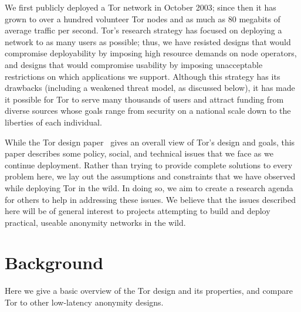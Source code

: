 \documentclass{llncs}
\begin{document}
We first publicly deployed a Tor network in October 2003; since then it has
grown to over a hundred volunteer Tor nodes
and as much as 80 megabits of
average traffic per second.  Tor's research strategy has focused on deploying
a network to as many users as possible; thus, we have resisted designs that
would compromise deployability by imposing high resource demands on node
operators, and designs that would compromise usability by imposing
unacceptable restrictions on which applications we support.  Although this
strategy has
its drawbacks (including a weakened threat model, as discussed below), it has
made it possible for Tor to serve many thousands of users and attract
funding from diverse sources whose goals range from security on a
national scale down to the liberties of each individual.

While the Tor design paper~\cite{tor-design} gives an overall view of Tor's
design and goals, this paper describes some policy, social, and technical
issues that we face as we continue deployment.
Rather than trying to provide complete solutions to every problem here, we
lay out the assumptions and constraints that we have observed while
deploying Tor in the wild.  In doing so, we aim to create a research agenda
for others to help in addressing these issues.  We believe that the issues
described here will be of general interest to projects attempting to build
and deploy practical, useable anonymity networks in the wild.


\section{Background}
Here we give a basic overview of the Tor design and its properties, and
compare Tor to other low-latency anonymity designs.
\end{document}
